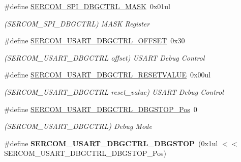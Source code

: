 \begin{DoxyCompactItemize}
\item 
\hypertarget{group___s_a_m_l21___s_e_r_c_o_m_ga7e838061522045a293d8ebbf7d6eb8bc}{}\#define \hyperlink{group___s_a_m_l21___s_e_r_c_o_m_ga7e838061522045a293d8ebbf7d6eb8bc}{S\+E\+R\+C\+O\+M\+\_\+\+S\+P\+I\+\_\+\+D\+B\+G\+C\+T\+R\+L\+\_\+\+M\+A\+S\+K}~0x01ul\label{group___s_a_m_l21___s_e_r_c_o_m_ga7e838061522045a293d8ebbf7d6eb8bc}

\begin{DoxyCompactList}\small\item\em (S\+E\+R\+C\+O\+M\+\_\+\+S\+P\+I\+\_\+\+D\+B\+G\+C\+T\+R\+L) M\+A\+S\+K Register \end{DoxyCompactList}\item 
\hypertarget{group___s_a_m_l21___s_e_r_c_o_m_gae342b3c1cc55a5d88e9ed4bb8eba2503}{}\#define \hyperlink{group___s_a_m_l21___s_e_r_c_o_m_gae342b3c1cc55a5d88e9ed4bb8eba2503}{S\+E\+R\+C\+O\+M\+\_\+\+U\+S\+A\+R\+T\+\_\+\+D\+B\+G\+C\+T\+R\+L\+\_\+\+O\+F\+F\+S\+E\+T}~0x30\label{group___s_a_m_l21___s_e_r_c_o_m_gae342b3c1cc55a5d88e9ed4bb8eba2503}

\begin{DoxyCompactList}\small\item\em (S\+E\+R\+C\+O\+M\+\_\+\+U\+S\+A\+R\+T\+\_\+\+D\+B\+G\+C\+T\+R\+L offset) U\+S\+A\+R\+T Debug Control \end{DoxyCompactList}\item 
\hypertarget{group___s_a_m_l21___s_e_r_c_o_m_gad3407790c60c5f5d6a39575e5dfd5bbe}{}\#define \hyperlink{group___s_a_m_l21___s_e_r_c_o_m_gad3407790c60c5f5d6a39575e5dfd5bbe}{S\+E\+R\+C\+O\+M\+\_\+\+U\+S\+A\+R\+T\+\_\+\+D\+B\+G\+C\+T\+R\+L\+\_\+\+R\+E\+S\+E\+T\+V\+A\+L\+U\+E}~0x00ul\label{group___s_a_m_l21___s_e_r_c_o_m_gad3407790c60c5f5d6a39575e5dfd5bbe}

\begin{DoxyCompactList}\small\item\em (S\+E\+R\+C\+O\+M\+\_\+\+U\+S\+A\+R\+T\+\_\+\+D\+B\+G\+C\+T\+R\+L reset\+\_\+value) U\+S\+A\+R\+T Debug Control \end{DoxyCompactList}\item 
\hypertarget{group___s_a_m_l21___s_e_r_c_o_m_ga8229561a6f5075c5e4809d83aa45d069}{}\#define \hyperlink{group___s_a_m_l21___s_e_r_c_o_m_ga8229561a6f5075c5e4809d83aa45d069}{S\+E\+R\+C\+O\+M\+\_\+\+U\+S\+A\+R\+T\+\_\+\+D\+B\+G\+C\+T\+R\+L\+\_\+\+D\+B\+G\+S\+T\+O\+P\+\_\+\+Pos}~0\label{group___s_a_m_l21___s_e_r_c_o_m_ga8229561a6f5075c5e4809d83aa45d069}

\begin{DoxyCompactList}\small\item\em (S\+E\+R\+C\+O\+M\+\_\+\+U\+S\+A\+R\+T\+\_\+\+D\+B\+G\+C\+T\+R\+L) Debug Mode \end{DoxyCompactList}\item 
\hypertarget{group___s_a_m_l21___s_e_r_c_o_m_gac814aadbe60d7dfdc30c601c8443c435}{}\#define {\bfseries S\+E\+R\+C\+O\+M\+\_\+\+U\+S\+A\+R\+T\+\_\+\+D\+B\+G\+C\+T\+R\+L\+\_\+\+D\+B\+G\+S\+T\+O\+P}~(0x1ul $<$$<$ S\+E\+R\+C\+O\+M\+\_\+\+U\+S\+A\+R\+T\+\_\+\+D\+B\+G\+C\+T\+R\+L\+\_\+\+D\+B\+G\+S\+T\+O\+P\+\_\+\+Pos)\label{group___s_a_m_l21___s_e_r_c_o_m_gac814aadbe60d7dfdc30c601c8443c435}


\end{DoxyCompactItemize}
